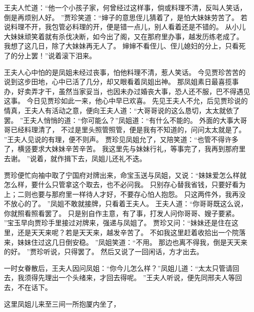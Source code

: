 王夫人忙道：“他一个小孩子家，何曾经过这样事，倘或料理不清，反叫人笑话，倒是再烦别人好。
”贾珍笑道：“婶子的意思侄儿猜着了，是怕大妹妹劳苦了。
若说料理不开，我包管必料理的开，便是错一点儿，别人看着还是不错的。
从小儿大妹妹顽笑着就有杀伐决断，如今出了阁，又在那府里办事，越发历练老成了。
我想了这几日，除了大妹妹再无人了。
婶婶不看侄儿、侄儿媳妇的分上，只看死了的分上罢！”说着滚下泪来。
\par
王夫人心中怕的是凤姐未经过丧事，怕他料理不清，惹人笑话。
今见贾珍苦苦的说到这步田地，心中已活了几分，却又眼看着凤姐出神。
那凤姐素日最喜揽事办，好卖弄才干，虽然当家妥当，也因未办过婚丧大事，恐人还不服，巴不得遇见这事。
今日见贾珍如此一来，他心中早已欢喜。
先见王夫人不允，后见贾珍说的情真，王夫人有活动之意，便向王夫人道：“大哥哥说的这么恳切，太太就依了罢。
”王夫人悄悄的道：“你可能么？”凤姐道：“有什么不能的。
外面的大事大哥哥已经料理清了，
不过是里头照管照管，便是我有不知道的，问问太太就是了。
”王夫人见说的有理，便不则声。
贾珍见凤姐允了，又陪笑道：“也管不得许多了，横竖要求大妹妹辛苦辛苦。
我这里先与妹妹行礼，等事完了，我再到那府里去谢。
”说着，就作揖下去，凤姐儿还礼不迭。
\par
贾珍便忙向袖中取了宁国府对牌出来，命宝玉送与凤姐，又说：“妹妹爱怎么样就怎么样，要什么只管拿这个取去，也不必问我。
只别存心替我省钱，只要好看为上；二则也要与那府里一样待人才好，不要存心怕人抱怨。
只这两件外，我再没不放心的了。
”凤姐不敢就接牌，只看着王夫人。
王夫人道：“你哥哥既这么说，你就照看照看罢了。
只是别自作主意，有了事，打发人问你哥哥、嫂子要紧。
”宝玉早向贾珍手里接过对牌来，强递与凤姐了。
贾珍又问：“妹妹还是住在这里，还是天天来呢？若是天天来，越发辛苦了。
不如我这里赶着收拾出一个院落来，妹妹住过这几日倒安稳。
”凤姐笑道：“不用。
那边也离不得我，倒是天天来的好。
”贾珍听说，只得罢了。
然后又说了一回闲话，方才出去。
\par
一时女眷散后，王夫人因问凤姐：“你今儿怎么样？”凤姐儿道：“太太只管请回去，我须得先理出一个头绪来，才回去得呢。
”王夫人听说，便先同邢夫人等回去，不在话下。
\par
这里凤姐儿来至三间一所抱厦内坐了，
